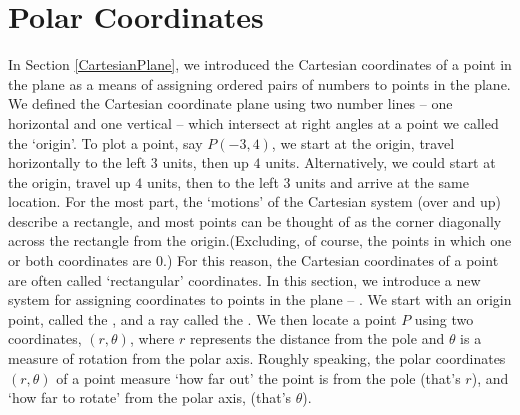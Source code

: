 \section{Polar Coordinates}

\label{IntroPolar}

In Section \ref{CartesianPlane}, we introduced the Cartesian coordinates of a point in the plane as a means of assigning ordered pairs of numbers to points in the plane.  We defined the Cartesian coordinate plane using two number lines -- one horizontal and one vertical -- which intersect at right angles at a point we called the `origin'. To plot a point, say $P(-3,4)$, we start at the origin, travel horizontally to the left $3$ units, then up $4$ units. Alternatively, we could start at the origin, travel up $4$ units, then to the left $3$ units and arrive at the same location. For the most part, the `motions' of the Cartesian system (over and up) describe a rectangle, and most points can be thought of as the corner diagonally across the rectangle from the origin.(Excluding, of course, the points in which one or both coordinates are $0$.)  For this reason, the Cartesian coordinates of a point are often called    `rectangular' coordinates. In this section, we introduce a new system for assigning coordinates to points in the plane --   .  We start with an origin point, called the  , and a ray called the  . We then locate a point $P$ using two coordinates, $(r,\theta)$, where $r$ represents the distance from the pole and $\theta$ is a measure of rotation from the polar axis.  Roughly speaking,  the polar coordinates $(r,\theta)$ of a point measure `how far out' the point is from the pole (that's $r$), and `how far to rotate' from the polar axis, (that's $\theta$).



